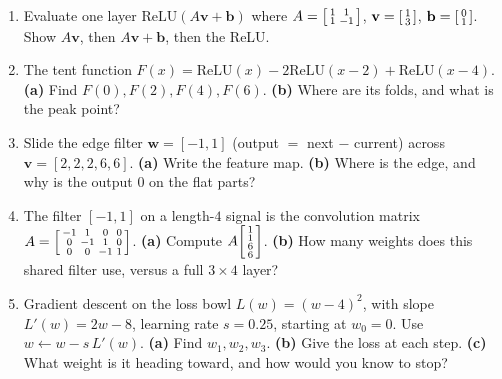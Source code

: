 \documentclass[10pt]{article}
\newcommand{\vv}{\mathbf{v}}
\newcommand{\bb}{\mathbf{b}}
\newcommand{\ww}{\mathbf{w}}
\newcommand{\relu}{\mathrm{ReLU}}
\begin{document}
\begin{enumerate}[leftmargin=1.9em, itemsep=12pt]
  \item Evaluate one layer $\relu(A\vv+\bb)$ where
        $A=\begin{bsmallmatrix}1&1\\1&-1\end{bsmallmatrix}$, $\vv=\begin{bsmallmatrix}1\\3\end{bsmallmatrix}$,
        $\bb=\begin{bsmallmatrix}0\\1\end{bsmallmatrix}$. Show $A\vv$, then $A\vv+\bb$, then the ReLU.
        \vspace{2.6cm}
  \item The tent function $F(x)=\relu(x)-2\relu(x-2)+\relu(x-4)$.
        \textbf{(a)} Find $F(0),F(2),F(4),F(6)$. \textbf{(b)} Where are its folds, and what is the peak point?
        \vspace{2.8cm}
  \item Slide the edge filter $\ww=[-1,1]$ (output $=$ next $-$ current) across $\vv=[2,2,2,6,6]$.
        \textbf{(a)} Write the feature map. \textbf{(b)} Where is the edge, and why is the output $0$ on the flat parts?
        \vspace{2.6cm}
  \item The filter $[-1,1]$ on a length-$4$ signal is the convolution matrix
        $A=\begin{bsmallmatrix}-1&1&0&0\\0&-1&1&0\\0&0&-1&1\end{bsmallmatrix}$.
        \textbf{(a)} Compute $A\begin{bsmallmatrix}1\\1\\6\\6\end{bsmallmatrix}$.
        \textbf{(b)} How many weights does this shared filter use, versus a full $3\times4$ layer?
        \vspace{2.8cm}
  \item Gradient descent on the loss bowl $L(w)=(w-4)^2$, with slope $L'(w)=2w-8$, learning rate $s=0.25$,
        starting at $w_0=0$. Use $w\leftarrow w-s\,L'(w)$.
        \textbf{(a)} Find $w_1,w_2,w_3$. \textbf{(b)} Give the loss at each step. \textbf{(c)} What weight is it heading toward, and how would you know to stop?
        \vspace{3.0cm}

\end{enumerate}
\end{document}
